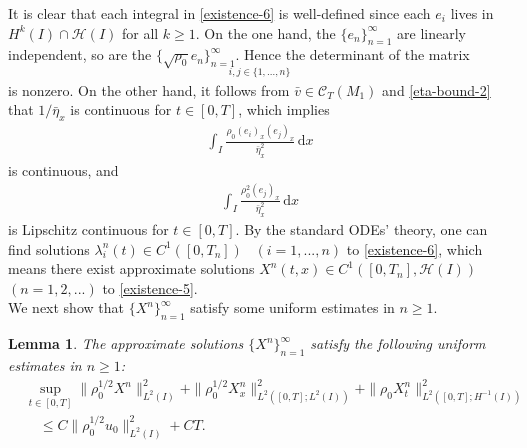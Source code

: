 \documentclass[11pt, reqno]{amsart}
\newcommand{\diff}{\mathrm{d}}
\newtheorem{lemma}{Lemma}
\numberwithin{equation}{section}
\begin{document}
{It is clear that each integral in \eqref{existence-6} is well-defined since each \(e_i\) lives in \(H^k(I)\cap \mathcal{H}(I)\) for all \(k\geq 1\). On the one hand, the \(\{e_n\}_{n=1}^\infty\) are linearly independent, so are the \(\{\sqrt{\rho_0}e_n\}_{n=1}^\infty\). Hence the determinant of the matrix
\begin{align*}
	[\sqrt{\rho_0}e_i,\sqrt{\rho_0}e_j]_{i,j\in\{1,\dots,n\}}
\end{align*}
is nonzero. On the other hand, it follows from \(\bar{v}\in \mathcal{C}_T(M_1)\) and \eqref{eta-bound-2} that \(1/\bar{\eta}_x\) is continuous for \(t\in[0,T]\), which implies 
\begin{align*} 
	\int_I\frac{\rho_0(e_i)_x(e_j)_x}{\bar{\eta}_x^2}\,\diff x
\end{align*}
is continuous, and
\begin{align*} 
     \int_I \frac{\rho_0^2 (e_j)_x}{\bar{\eta}_x^2}\,\diff x
\end{align*}
is Lipschitz continuous for \(t\in[0,T]\). By the standard ODEs' theory, one can find solutions \(\lambda_i^n(t)\in C^1([0,T_n])\) \ \((i=1,...,n)\) to \eqref{existence-6}, which
means there exist approximate solutions \(X^n(t,x)\in C^1([0,T_n],\mathcal{H}(I))\)\ \((n=1,2,...)\) to \eqref{existence-5}.\\


We next show that \(\{X^n\}_{n=1}^\infty\)  satisfy some uniform estimates in \(n\geq 1\).



\begin{lemma}\label{uniform estimates} The approximate solutions \(\{X^n\}_{n=1}^\infty\) satisfy the following uniform estimates in \(n\geq 1\):
\begin{equation}\label{first uniform estimates}
	\begin{aligned}
		&\underset{t\in[0,T]}{\sup}\|\rho_0^{1/2}X^n\|_{L^2(I)}^2
		+\|\rho_0^{1/2}X_x^n\|_{L^2([0,T];L^2(I))}^2+\|\rho_0 X_t^n\|_{L^2([0,T];H^{-1}(I))}^2\\
		&\quad\leq C\|\rho_0^{1/2}u_0\|_{L^2(I)}^2+CT.
	\end{aligned}
\end{equation}
	
\end{lemma}

}
\end{document}
